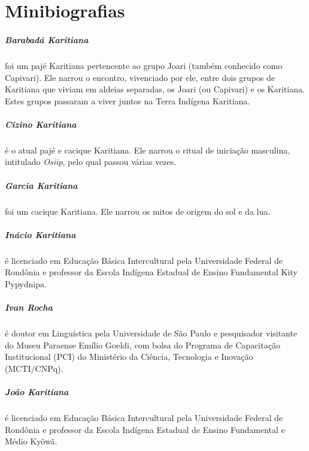 \chapter{Minibiografias}

\paragraph{Barabadá Karitiana} foi um pajé Karitiana pertencente ao grupo Joari
(também conhecido como Capivari). Ele narrou o encontro, vivenciado por
ele, entre dois grupos de Karitiana que viviam em aldeias separadas, os
Joari (ou Capivari) e os Karitiana. Estes grupos passaram a viver juntos
na Terra Indígena Karitiana.

\paragraph{Cizino Karitiana} é o atual pajé e cacique Karitiana. Ele narrou o ritual
de iniciação masculina, intitulado \emph{Osiip}, pelo qual passou várias
vezes.

\paragraph{Garcia Karitiana} foi um cacique Karitiana. Ele narrou os mitos de origem
do sol e da lua.

\paragraph{Inácio Karitiana} é licenciado em Educação Básica Intercultural pela
Universidade Federal de Rondônia e professor da Escola Indígena Estadual
de Ensino Fundamental Kity Pypydnipa.

\paragraph{Ivan Rocha} é doutor em Linguística pela Universidade de São Paulo e
pesquisador visitante do Museu Paraense Emílio Goeldi, com bolsa do
Programa de Capacitação Institucional (PCI) do Ministério da Ciência,
Tecnologia e Inovação (MCTI/CNPq).

\paragraph{João Karitiana} é licenciado em Educação Básica Intercultural pela
Universidade Federal de Rondônia e professor da Escola Indígena Estadual
de Ensino Fundamental e Médio Kyõwã.

